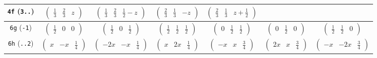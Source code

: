 \documentclass[fleqn,9pt,landscape]{jsarticle}
\begin{document}
\begin{center}
\begin{longtable}{ccccccc}
{\tt 4f} ({\tt 3..}) & $ \begin{pmatrix} \frac{1}{3} & \frac{2}{3} & z \end{pmatrix} $ & $ \begin{pmatrix} \frac{1}{3} & \frac{2}{3} & \frac{1}{2} - z \end{pmatrix} $ & $ \begin{pmatrix} \frac{2}{3} & \frac{1}{3} & - z \end{pmatrix} $ & $ \begin{pmatrix} \frac{2}{3} & \frac{1}{3} & z + \frac{1}{2} \end{pmatrix} $ & $  $ & $  $ \\ \hline
{\tt 6g} ({\tt -1}) & $ \begin{pmatrix} \frac{1}{2} & 0 & 0 \end{pmatrix} $ & $ \begin{pmatrix} \frac{1}{2} & 0 & \frac{1}{2} \end{pmatrix} $ & $ \begin{pmatrix} \frac{1}{2} & \frac{1}{2} & \frac{1}{2} \end{pmatrix} $ & $ \begin{pmatrix} 0 & \frac{1}{2} & \frac{1}{2} \end{pmatrix} $ & $ \begin{pmatrix} 0 & \frac{1}{2} & 0 \end{pmatrix} $ & $ \begin{pmatrix} \frac{1}{2} & \frac{1}{2} & 0 \end{pmatrix} $ \\ \hline
{\tt 6h} ({\tt ..2}) & $ \begin{pmatrix} x & - x & \frac{1}{4} \end{pmatrix} $ & $ \begin{pmatrix} - 2 x & - x & \frac{1}{4} \end{pmatrix} $ & $ \begin{pmatrix} x & 2 x & \frac{1}{4} \end{pmatrix} $ & $ \begin{pmatrix} - x & x & \frac{3}{4} \end{pmatrix} $ & $ \begin{pmatrix} 2 x & x & \frac{3}{4} \end{pmatrix} $ & $ \begin{pmatrix} - x & - 2 x & \frac{3}{4} \end{pmatrix} $ \\ \hline

\end{longtable}
\end{center}
\end{document}
